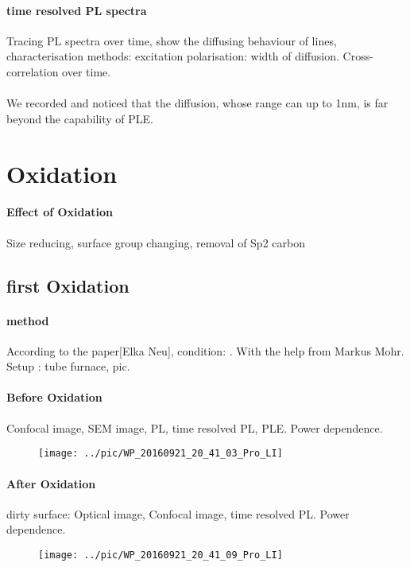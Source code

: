 \paragraph{time resolved PL spectra} Tracing PL spectra over time, show the diffusing behaviour of lines, characterisation methods: excitation polarisation: width of diffusion. Cross- correlation over time.
\paragraph{}We recorded and noticed that the diffusion, whose range can up to 1nm, is far beyond the capability of PLE. 

\section{Oxidation}
\paragraph{Effect of Oxidation} Size reducing, surface group changing, removal of Sp2 carbon

\subsection[first Oxidation]{first Oxidation}
\paragraph{method}According to the paper[Elka Neu], condition: . With the help from Markus Mohr. Setup : tube furnace, pic. 

\paragraph{Before Oxidation} Confocal image, SEM image, PL, time resolved PL, PLE. Power dependence.
\begin{figure}[h]
\centering
\texttt{[image: ../pic/WP\_20160921\_20\_41\_03\_Pro\_LI]}
\caption{}
\label{fig:wp20160921204103proli}
\end{figure}

\paragraph{After Oxidation}dirty surface: Optical image, Confocal image, time resolved PL. Power dependence.
\begin{figure}[h]
\centering
\texttt{[image: ../pic/WP\_20160921\_20\_41\_09\_Pro\_LI]}
\caption{}
\label{fig:wp20160921204109proli}
\end{figure}

